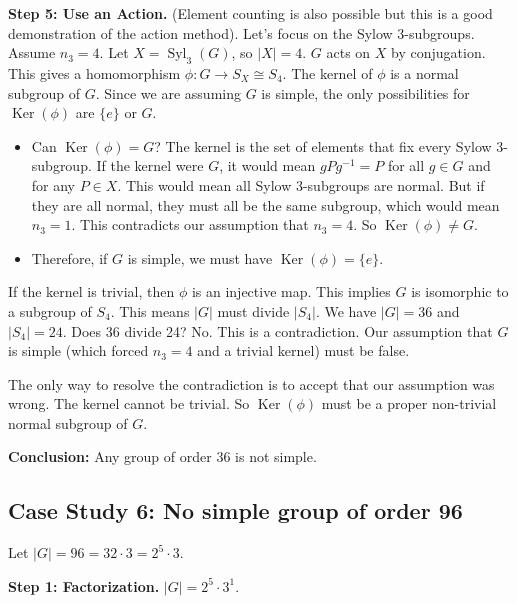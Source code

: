 \documentclass[12pt,a4paper]{article}
\theoremstyle{plain} %
\theoremstyle{definition} %
\theoremstyle{remark} %
\DeclareMathOperator{\Syl}{Syl}
\DeclareMathOperator{\Ker}{Ker}
\begin{document}
\textbf{Step 5: Use an Action.} (Element counting is also possible but this is a good demonstration of the action method).
Let's focus on the Sylow 3-subgroups. Assume $n_3=4$.
Let $X = \Syl_3(G)$, so $|X|=4$.
$G$ acts on $X$ by conjugation. This gives a homomorphism $\phi: G \to S_X \cong S_4$.
The kernel of $\phi$ is a normal subgroup of $G$. Since we are assuming $G$ is simple, the only possibilities for $\Ker(\phi)$ are $\{e\}$ or $G$.
\begin{itemize}
    \item Can $\Ker(\phi) = G$? The kernel is the set of elements that fix every Sylow 3-subgroup. If the kernel were $G$, it would mean $gPg^{-1}=P$ for all $g \in G$ and for any $P \in X$. This would mean all Sylow 3-subgroups are normal. But if they are all normal, they must all be the same subgroup, which would mean $n_3=1$. This contradicts our assumption that $n_3=4$. So $\Ker(\phi) \neq G$.
    \item Therefore, if $G$ is simple, we must have $\Ker(\phi) = \{e\}$.
\end{itemize}
If the kernel is trivial, then $\phi$ is an injective map. This implies $G$ is isomorphic to a subgroup of $S_4$.
This means $|G|$ must divide $|S_4|$.
We have $|G|=36$ and $|S_4|=24$.
Does 36 divide 24? No.
This is a contradiction. Our assumption that $G$ is simple (which forced $n_3=4$ and a trivial kernel) must be false.

The only way to resolve the contradiction is to accept that our assumption was wrong. The kernel cannot be trivial. So $\Ker(\phi)$ must be a proper non-trivial normal subgroup of $G$.

\textbf{Conclusion:} Any group of order 36 is not simple.

\subsection{Case Study 6: No simple group of order 96}
Let $|G|=96 = 32 \cdot 3 = 2^5 \cdot 3$.

\textbf{Step 1: Factorization.} $|G|=2^5 \cdot 3^1$.
\end{document}
